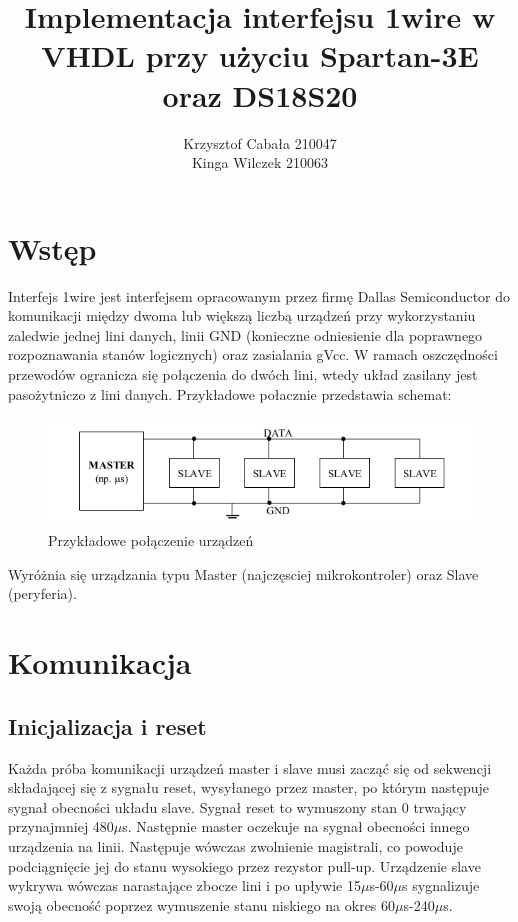 \documentclass[a4paper]{article}
\title{\vspace{80mm}Implementacja interfejsu 1wire w VHDL przy użyciu Spartan-3E oraz DS18S20}
\author{Krzysztof Cabała 210047\\ Kinga Wilczek 210063\vspace{110mm}}
\begin{document}
\maketitle
\thispagestyle{empty}

\tableofcontents
\newpage
\listoffigures

\newpage
\section{Wstęp}
Interfejs 1wire jest interfejsem opracowanym przez firmę Dallas Semiconductor do komunikacji między dwoma lub większą liczbą urządzeń przy wykorzystaniu zaledwie jednej lini danych, linii GND (konieczne odniesienie dla poprawnego rozpoznawania stanów logicznych) oraz zasialania gVcc. 
W ramach oszczędności przewodów ogranicza się połączenia do dwóch lini, wtedy układ zasilany jest pasożytniczo z lini danych.
Przykładowe połacznie przedstawia schemat:

\begin{figure}[h]
\begin{center}
\includegraphics[scale=0.3]{graphics/idea.png}
\end{center}
\label{schemonewire}
\caption{Przykładowe połączenie urządzeń}
\end{figure}

Wyróżnia się urządzania typu Master (najczęsciej mikrokontroler) oraz Slave (peryferia).

\section{Komunikacja}



\subsection{Inicjalizacja i reset}

Każda próba komunikacji urządzeń master i slave musi zacząć się od sekwencji składającej się z sygnału reset, wysyłanego przez master, po którym następuje sygnał obecności układu slave. Sygnał reset to wymuszony stan 0 trwający przynajmniej 480$\mu$s. Następnie master oczekuje na sygnał obecności innego urządzenia na linii. Następuje wówczas zwolnienie magistrali, co powoduje podciągnięcie jej do stanu wysokiego przez rezystor pull-up. Urządzenie slave wykrywa wówczas narastające zbocze lini i po upływie 15$\mu$s-60$\mu$s sygnalizuje swoją obecność poprzez wymuszenie stanu niskiego na okres 60$\mu$s-240$\mu$s.
\end{document}
